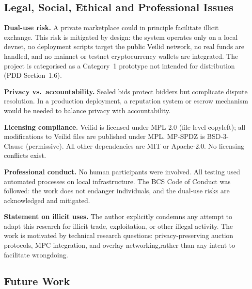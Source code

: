 \subsection{Legal, Social, Ethical and Professional Issues}
\label{sec:conc-lsepi}

\textbf{Dual-use risk.}  A private marketplace could in principle facilitate
illicit exchange.  This risk is mitigated by design: the system operates only
on a local devnet, no deployment scripts target the public Veilid network,
no real funds are handled, and no mainnet or testnet cryptocurrency wallets
are integrated.  The project is categorised as a Category~1 prototype not
intended for distribution (PDD Section~1.6).

\textbf{Privacy vs.\ accountability.}  Sealed bids protect bidders but
complicate dispute resolution.  In a production deployment, a reputation
system or escrow mechanism would be needed to balance privacy with
accountability.

\textbf{Licensing compliance.}  Veilid is licensed under MPL-2.0 (file-level
copyleft); all modifications to Veilid files are published under MPL.  MP-SPDZ
is BSD-3-Clause (permissive).  All other dependencies are MIT or Apache-2.0.
No licensing conflicts exist.

\textbf{Professional conduct.}  No human participants were involved.  All
testing used automated processes on local infrastructure.  The BCS Code of
Conduct was followed: the work does not endanger individuals, and the
dual-use risks are acknowledged and mitigated.

\textbf{Statement on illicit uses.}  The author explicitly condemns any
attempt to adapt this research for illicit trade, exploitation, or other
illegal activity.  The work is motivated by technical research questions:
privacy-preserving auction protocols, MPC integration, and overlay
networking,rather than any intent to facilitate wrongdoing.

\subsection{Future Work}
\label{sec:conc-future}

